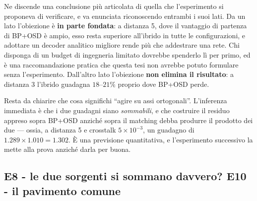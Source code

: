 Ne discende una conclusione più articolata di quella che l'esperimento si proponeva di verificare, e va enunciata riconoscendo entrambi i suoi lati. Da un lato l'obiezione è \textbf{in parte fondata}: a distanza 5, dove il vantaggio di partenza di BP+OSD è ampio, esso resta superiore all'ibrido in tutte le configurazioni, e adottare un decoder analitico migliore rende più che addestrare una rete. Chi disponga di un budget di ingegneria limitato dovrebbe spenderlo lì per primo, ed è una raccomandazione pratica che questa tesi non avrebbe potuto formulare senza l'esperimento. Dall'altro lato l'obiezione \textbf{non elimina il risultato}: a distanza 3 l'ibrido guadagna $18$--$21\%$ proprio dove BP+OSD perde.

Resta da chiarire che cosa significhi ``agire su assi ortogonali''. L'inferenza immediata è che i due guadagni siano \emph{sommabili}, e che costruire il residuo appreso sopra BP+OSD anziché sopra il matching debba produrre il prodotto dei due --- ossia, a distanza 5 e crosstalk $5\times10^{-3}$, un guadagno di $1.289 \times 1.010 = 1.302$. È una previsione quantitativa, e l'esperimento successivo la mette alla prova anziché darla per buona.

\subsection[E8/E10 - rumori combinati e pavimento comune]{E8 - le due sorgenti si sommano davvero? E10 - il pavimento comune}
\label{subsec:neural_pavimento}

